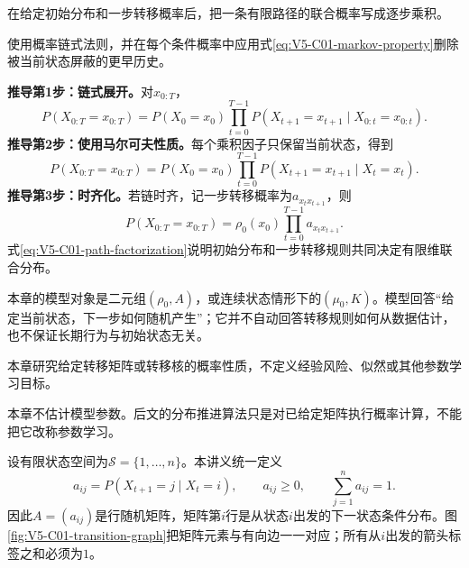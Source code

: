 
\begin{derivationgoalbox}
在给定初始分布和一步转移概率后，把一条有限路径的联合概率写成逐步乘积。
\end{derivationgoalbox}
\begin{derivationprepbox}
使用概率链式法则，并在每个条件概率中应用式\eqref{eq:V5-C01-markov-property}删除被当前状态屏蔽的更早历史。
\end{derivationprepbox}
\textbf{推导第1步：链式展开。}对$x_{0:T}$，
\[
P(X_{0:T}=x_{0:T})=P(X_0=x_0)
\prod_{t=0}^{T-1}P(X_{t+1}=x_{t+1}\mid X_{0:t}=x_{0:t}).
\]
\textbf{推导第2步：使用马尔可夫性质。}每个乘积因子只保留当前状态，得到
\[
P(X_{0:T}=x_{0:T})=P(X_0=x_0)
\prod_{t=0}^{T-1}P(X_{t+1}=x_{t+1}\mid X_t=x_t).
\]
\textbf{推导第3步：时齐化。}若链时齐，记一步转移概率为$a_{x_tx_{t+1}}$，则
\begin{equation}\label{eq:V5-C01-path-factorization}
P(X_{0:T}=x_{0:T})=\rho_0(x_0)\prod_{t=0}^{T-1}a_{x_tx_{t+1}}.
\end{equation}
式\eqref{eq:V5-C01-path-factorization}说明初始分布和一步转移规则共同决定有限维联合分布。

\label{struct:V5-C01-CH08}
本章的模型对象是二元组$(\rho_0,A)$，或连续状态情形下的$(\mu_0,K)$。模型回答“给定当前状态，下一步如何随机产生”；它并不自动回答转移规则如何从数据估计，也不保证长期行为与初始状态无关。

\label{struct:V5-C01-CH09}
\label{struct:V5-C01-CH10}
\begin{notapplicablebox}[title=本章范围]
本章研究给定转移矩阵或转移核的概率性质，不定义经验风险、似然或其他参数学习目标。

本章不估计模型参数。后文的分布推进算法只是对已给定矩阵执行概率计算，不能把它改称参数学习。
\end{notapplicablebox}

设有限状态空间为$\mathcal S=\{1,\ldots,n\}$。本讲义统一定义
\begin{equation}\label{eq:V5-C01-row-transition}
a_{ij}=P(X_{t+1}=j\mid X_t=i),\qquad
a_{ij}\ge0,\qquad \sum_{j=1}^n a_{ij}=1.
\end{equation}
因此$A=(a_{ij})$是行随机矩阵，矩阵第$i$行是从状态$i$出发的下一状态条件分布。图\ref{fig:V5-C01-transition-graph}把矩阵元素与有向边一一对应；所有从$i$出发的箭头标签之和必须为$1$。



